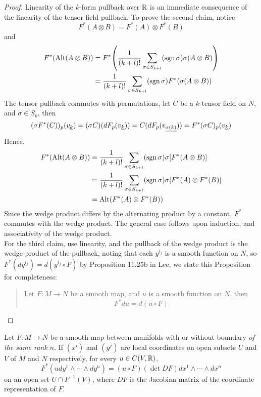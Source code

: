 \documentclass[../main-manifolds.tex]{subfiles}
\begin{document}
    \begin{proof}
        Linearity of the $k$-form pullback over $\mathbb{R}$ is an immediate consequence of the linearity of the tensor field pullback. To prove the second claim, notice 
        \[
            F^*(A\otimes B) = F^*(A)\otimes F^*(B)
        \]
        and
        \begin{align*}
            F^*(\operatorname{Alt}(A\otimes B)) &= F^*\qty(\dfrac{1}{(k+l)!}\sum_{\sigma\in S_{k+l}}(\operatorname{sgn}\sigma)\sigma(A\otimes B))\\
            &= \dfrac{1}{(k+l)!}\sum_{\sigma\in S_{k+l}}(\operatorname{sgn}\sigma)F^*(\sigma(A\otimes B))
        \end{align*}
        The tensor pullback commutes with permutations, let $C$ be a $k$-tensor field on $N$, and $\sigma\in S_k$, then
        \[
            (\sigma F^*(C))_p(\Ul{v}[k]) = (\sigma C) (dF_p(\Ul{v}[k])) = C(dF_p(\Ul{v}[\sigma(k)])) = F^*(\sigma C)_p(\Ul{v}[k])
        \]
        Hence,
        \begin{align*}
            F^*(\operatorname{Alt}(A\otimes B)) &= \dfrac{1}{(k+l)!}\sum_{\sigma\in S_{k+l}}(\operatorname{sgn}\sigma)\sigma\qty[ F^*(A\otimes B)]\\
            &= \dfrac{1}{(k+l)!}\sum_{\sigma\in S_{k+l}}(\operatorname{sgn}\sigma)\sigma\qty[ F^*(A)\otimes F^*(B)]\\
            &= \operatorname{Alt}(F^*(A)\otimes F^*(B))
        \end{align*}
        Since the wedge product differs by the alternating product by a constant, $F^*$ commutes with the wedge product. The general case follows upon induction, and associativity of the wedge product.\\

        For the third claim, use linearity, and the pullback of the wedge product is the wedge product of the pullback, noting that each $y^{i_j}$ is a smooth function on $N$, so $F^*(dy^{i_j}) = d(y^{i_j}\circ F)$ by Proposition 11.25b in Lee, we state this Proposition for completeness:
        \begin{quote}
            Let $F:M\to N$ be a smooth map, and $u$ is a smooth function on $N$, then
            \[
                F^*du = d(u\circ F)
            \]
        \end{quote}
    \end{proof}
    \begin{wts}\label{lee-chp14:corollary-14.21}
        Let $F: M\to N$ be a smooth map between manifolds with or without boundary \emph{of the same rank $n$}. If $(x^i)$ and $(y^j)$ are local coordinates on open subsets $U$ and $V$ of $M$ and $N$ respectively, for every $u\in C(V,\mathbb{R})$, 
        \[
            F^*(udy^1\wedge \cdots\wedge dy^n)= (u\circ F)(\det DF)dx^1\wedge\cdots\wedge dx^n
        \]
        on an open set $U\cap F^{-1}(V)$, where $DF$ is the Jacobian matrix of the coordinate representation of $F$. 
    \end{wts}
\end{document}
